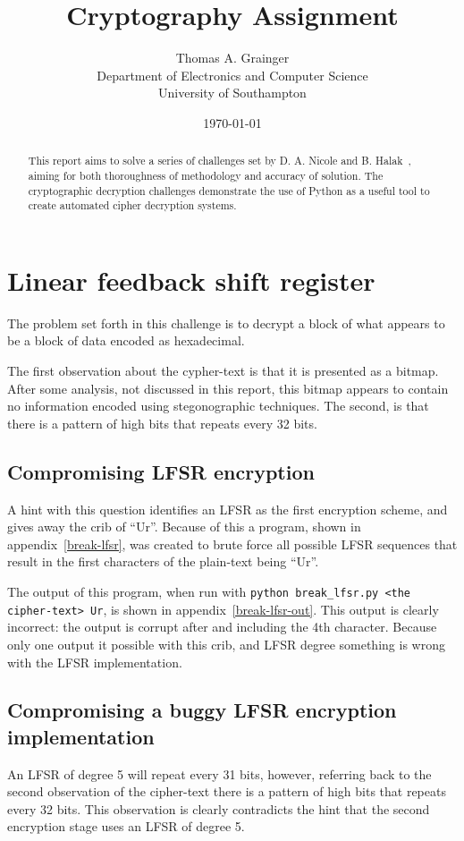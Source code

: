 \documentclass[pdftex, 12pt, a4paper]{article}
\title{Cryptography Assignment}
\author{
        Thomas A. Grainger \\
                Department of Electronics and Computer Science\\
        University of Southampton\\
}
\date{\today}
\begin{document}
\maketitle

\begin{abstract}
This report aims to solve a series of challenges set by D. A. Nicole and B. Halak~\cite{instructions}, aiming for both thoroughness of methodology and accuracy of solution.  The cryptographic decryption challenges demonstrate the use of Python as a useful tool to create automated cipher decryption systems.
\end{abstract}

\tableofcontents
\pagebreak
\section{Linear feedback shift register}

The problem set forth in this challenge is to decrypt a block of what appears to be a block of data encoded as hexadecimal.

The first observation about the cypher-text is that it is presented as a bitmap. After some analysis, not discussed in this report, this bitmap appears to contain no information encoded using stegonographic techniques.  The second, is that there is a pattern of high bits that repeats every 32 bits.

\subsection{Compromising LFSR encryption}
A hint with this question identifies an LFSR as the first encryption scheme, and gives away the crib of ``Ur''.  Because of this a program, shown in appendix~\ref{break-lfsr}, was created to brute force all possible LFSR sequences that result in the first characters of the plain-text being ``Ur''.

The output of this program, when run with \verb`python break_lfsr.py <the cipher-text> Ur`, is shown in appendix~\ref{break-lfsr-out}.  This output is clearly incorrect: the output is corrupt after and including the 4th character.  Because only one output it possible with this crib, and LFSR degree something is wrong with the LFSR implementation.

\subsection{Compromising a buggy LFSR encryption implementation}
An LFSR of degree 5 will repeat every 31 bits, however, referring back to the second observation of the cipher-text there is a pattern of high bits that repeats every 32 bits. This observation is clearly contradicts the hint that the second encryption stage uses an LFSR of degree 5.
\end{document}
